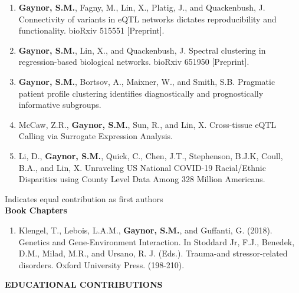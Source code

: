 \documentclass[10pt]{article}
\begin{document}
\begin{enumerate}
\item \textbf{Gaynor, S.M.}, Fagny, M., Lin, X., Platig, J., and Quackenbush, J. Connectivity of variants in eQTL networks dictates reproducibility and functionality. bioRxiv 515551 [Preprint].  
\item \textbf{Gaynor, S.M.}, Lin, X., and Quackenbush, J. Spectral clustering in regression-based biological networks. bioRxiv 651950 [Preprint].
\item \textbf{Gaynor, S.M.}, Bortsov, A., Maixner, W.,  and Smith, S.B. Pragmatic patient profile clustering identifies diagnostically and prognostically informative subgroups.
\item McCaw, Z.R., \textbf{Gaynor, S.M.}, Sun, R.,  and Lin, X. Cross-tissue eQTL Calling via Surrogate Expression Analysis.
\item Li, D., \textbf{Gaynor, S.M.}, Quick, C., Chen, J.T., Stephenson, B.J.K, Coull, B.A.,  and Lin, X. Unraveling US National COVID-19 Racial/Ethnic Disparities using County Level Data Among 328 Million Americans.
\end{enumerate}

\indent \indent  * Indicates equal contribution as first authors\\


\indent \textbf{Book Chapters} \\
\begin{enumerate}
	\item Klengel, T., Lebois, L.A.M., \textbf{Gaynor, S.M.}, and Guffanti, G. (2018). Genetics and Gene-Environment Interaction. In Stoddard Jr, F.J.,
Benedek, D.M., Milad, M.R., and Ursano, R. J. (Eds.). Trauma-and stressor-related disorders. Oxford University Press. (198-210).\\
\end{enumerate}

\vspace{0.cm}

{\bf  EDUCATIONAL CONTRIBUTIONS} \hrulefill \\
\end{document}

